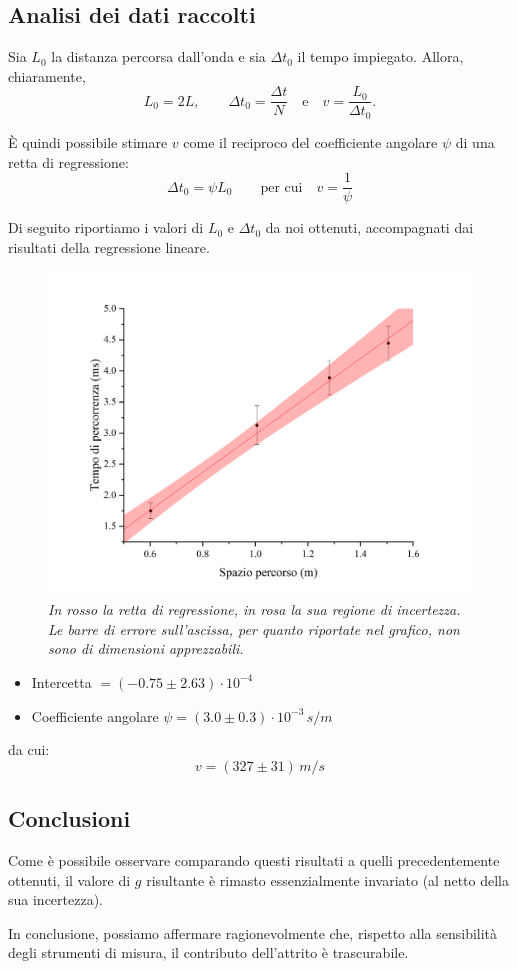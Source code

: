 \documentclass{article}
\begin{document}
\subsection{Analisi dei dati raccolti}

Sia $L_0$ la distanza percorsa dall'onda e sia $\Delta t_0$ il tempo
impiegato. Allora, chiaramente,
\[
  L_0 = 2L,
  \qquad
  \Delta t_0 = \frac{\Delta t}{N}
  \quad\text{e}\quad
  v = \frac{L_0}{\Delta t_0}.
\]

È quindi possibile stimare $v$ come il reciproco del coefficiente
angolare $\psi$ di una retta di regressione:
\[
  \Delta t_0 = \psi L_0
  \qquad\text{per cui}\quad v = \frac{1}{\psi}
\]

Di seguito riportiamo i valori di $L_0$ e $\Delta t_0$ da noi ottenuti,
accompagnati dai risultati della regressione lineare.

\begin{figure}[H]
  \includegraphics[trim={2.5cm 0.7cm 3cm 2cm},clip,width=\textwidth]{img/Graph2.png}
  \caption*{\emph{
    In rosso la retta di regressione, in rosa la sua regione di incertezza.
    Le barre di errore sull'ascissa, per quanto riportate nel grafico, non
    sono di dimensioni apprezzabili.
  }}
\end{figure}

\begin{itemize}
  \item Intercetta $= (-0.75 \pm 2.63)\cdot 10^{-4}$
  \item Coefficiente angolare $\psi = (3.0\pm0.3)\cdot 10^{-3}\,\unit{s\per m}$
\end{itemize}
da cui:
\[ v = (327 \pm 31)\,\unit{m \per s} \]

\subsection{Conclusioni}

Come è possibile osservare comparando questi risultati a
quelli precedentemente ottenuti, il valore di $g$ risultante
è rimasto essenzialmente invariato (al netto della sua incertezza).

In conclusione, possiamo affermare ragionevolmente che,
rispetto alla sensibilità degli strumenti di misura,
il contributo dell'attrito è trascurabile.
\end{document}
